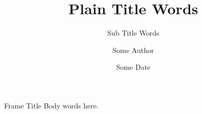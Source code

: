 \documentclass{beamer}
\title{Plain Title Words}
\subtitle{Sub Title Words}
\author{Some Author}
\institute{Some Institute}
\date{Some Date}
\begin{document}
\begin{frame}
\titlepage
\end{frame}
\begin{frame}{Frame Title}
Body words here.
\end{frame}
\end{document}
